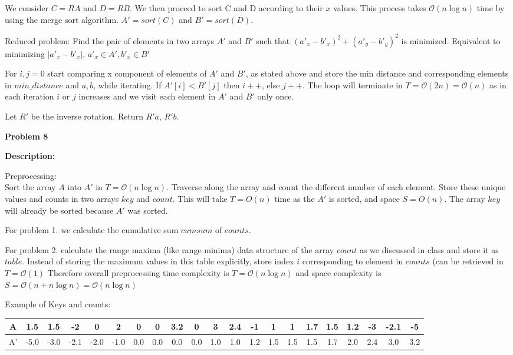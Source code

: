 \documentclass[10pt, a4paper]{article}
\newcommand{\BigO}{\mathcal{O}}
\begin{document}
We consider $C = RA$ and $D = RB$. We then proceed to sort C and D according to their $x $ values. This process takes $\BigO(n\log n)$ time by using the merge sort algorithm. $A' = sort(C)$ and $B' = sort(D)$.

Reduced problem: Find the pair of elements in two arrays $A'$ and $B'$ such that $(a'_x-b'_x)^2 + (a'_y - b'_y)^2$ is minimized. Equivalent to minimizing $|a'_x - b'_x|$, $a'_x \in A', b'_x \in B'$

For $i,j = 0$ start comparing x component of elements of $A'$ and $B'$, as stated above and store the min distance and corresponding elements in $min\_distance$ and $a,b$, while iterating. If $A'[i]<B'[j]$ then $i++$, else $j++$. The loop will terminate in $T = \BigO(2n)=\BigO(n)$ as in each iteration $i$ or $j$ increases and we visit each element in $A'$ and $B'$ only once.

Let $R'$ be the inverse rotation. Return $R'a$, $R'b$.

\newpage
\noindent\large{\textbf{Problem 8}}
\vspace{5pt}
\normalsize

\noindent\textbf{Description:}

Preprocessing:\\
Sort the array $A$ into $A'$ in $T = \BigO(n\log n)$. Traverse along the array and count the different number of each element. Store these unique values and counts in two arrays $key$ and $count$. This will take $T = O(n)$ time as the $A'$ is sorted, and space $S=O(n)$. The array $key$ will already be sorted because $A'$ was sorted. 

For problem 1. we calculate the cumulative sum $cumsum$ of $counts$.

For problem 2. calculate the range maxima (like range minima) data structure of the array $count$ as we discussed in class and store it as $table$. Instead of storing the maximum values in this table explicitly, store index $i$ corresponding to element in $counts$ (can be retrieved in $T = \BigO(1)$ Therefore overall preprocessing time complexity is $T = \BigO(n \log n)$ and space complexity is $S = \BigO(n + n \log n )= \BigO( n \log n)$

Example of Keys and counts:
\tiny
\begin{center}
    \begin{tabular}{ |c||c|c|c|c|c|c|c|c|c|c|c|c|c|c|c|c|c|c|c|c| }
     \hline
     A &1.5& 1.5& -2& 0& 2& 0& 0& 3.2& 0& 3& 2.4& -1& 1& 1& 1.7& 1.5& 1.2& -3& -2.1& -5\\
     \hline
     A'& -5.0& -3.0& -2.1& -2.0& -1.0& 0.0& 0.0& 0.0& 0.0& 1.0& 1.0& 1.2& 1.5& 1.5& 1.5& 1.7& 2.0& 2.4& 3.0& 3.2\\
     \hline
    \end{tabular}
\end{center}
\end{document}
